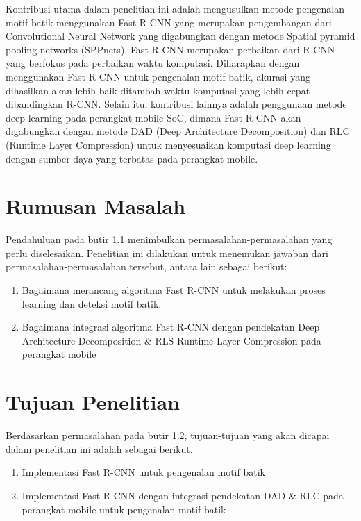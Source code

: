 Kontribusi utama dalam penelitian ini adalah mengusulkan metode pengenalan motif batik menggunakan Fast R-CNN yang merupakan pengembangan dari Convolutional Neural Network yang digabungkan dengan metode Spatial pyramid pooling networks (SPPnets). Fast R-CNN merupakan perbaikan dari R-CNN yang berfokus pada perbaikan waktu komputasi. Diharapkan dengan menggunakan Fast R-CNN untuk pengenalan motif batik, akurasi yang dihasilkan akan lebih baik ditambah waktu komputasi yang lebih cepat dibandingkan R-CNN. Selain itu, kontribusi lainnya adalah penggunaan metode deep learning pada perangkat mobile SoC, dimana Fast R-CNN akan digabungkan dengan metode DAD (Deep Architecture Decomposition) dan RLC (Runtime Layer Compression) untuk menyesuaikan komputasi deep learning dengan sumber daya yang terbatas pada perangkat mobile.

\section{Rumusan Masalah}
Pendahuluan pada butir 1.1 menimbulkan permasalahan-permasalahan yang perlu diselesaikan. Penelitian ini dilakukan untuk menemukan jawaban dari permasalahan-permasalahan tersebut, antara lain sebagai berikut:
\begin{enumerate}
	\item Bagaimana merancang algoritma Fast R-CNN untuk melakukan proses learning dan deteksi motif batik.
	\item Bagaimana integrasi algoritma Fast R-CNN dengan pendekatan Deep Architecture Decomposition \& RLS Runtime Layer Compression pada perangkat mobile
\end{enumerate}

\section{Tujuan Penelitian}
Berdasarkan permasalahan pada butir 1.2, tujuan-tujuan yang akan dicapai dalam penelitian ini adalah sebagai berikut.
\begin{enumerate}
	\item Implementasi Fast R-CNN untuk pengenalan motif batik
	\item Implementasi Fast R-CNN dengan integrasi pendekatan DAD \& RLC pada perangkat mobile untuk pengenalan motif batik
\end{enumerate}

